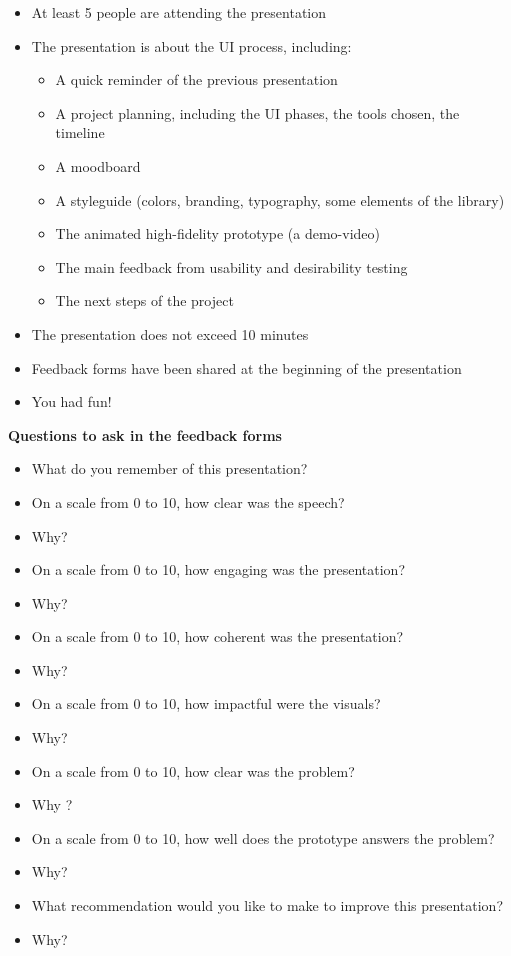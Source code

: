 \begin{itemize}
\item At least 5 people are attending the presentation
\item The presentation is about the UI process, including:
\begin{itemize}
\item A quick reminder of the previous presentation
\item A project planning, including the UI phases, the tools chosen, the timeline
\item A moodboard
\item A styleguide (colors, branding, typography, some elements of the library)
\item The animated high-fidelity prototype (a demo-video)
\item The main feedback from usability and desirability testing
\item The next steps of the project
\end{itemize}
\item The presentation does not exceed 10 minutes
\item Feedback forms have been shared at the beginning of the presentation
\item You had fun!
\end{itemize}

\textbf{Questions to ask in the feedback forms}

\begin{itemize}
\item What do you remember of this presentation?
\item On a scale from 0 to 10, how clear was the speech?
\item Why?
\item On a scale from 0 to 10, how engaging was the presentation?
\item Why?
\item On a scale from 0 to 10, how coherent was the presentation?
\item Why?
\item On a scale from 0 to 10, how impactful were the visuals?
\item Why?
\item On a scale from 0 to 10, how clear was the problem?
\item Why ?
\item On a scale from 0 to 10, how well does the prototype answers the problem?
\item Why?
\item What recommendation would you like to make to improve this presentation?
\item Why?
\end{itemize}

